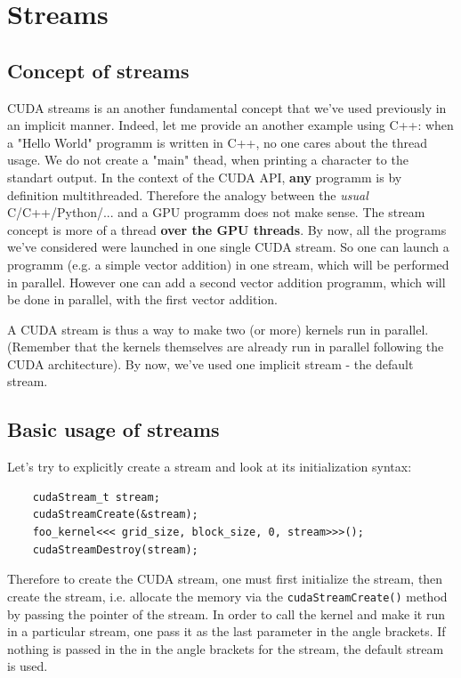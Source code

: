 \documentclass[12pt]{article}
\begin{document}
\section{Streams}
\subsection{Concept of streams}
CUDA streams is an another fundamental concept that we've used previously in an implicit manner.
Indeed, let me provide an another example using C++: when a "Hello World" programm is written in C++, 
no one cares about the thread usage. We do not create a "main" thead, when printing a character to 
the standart output. In the context of the CUDA API, \textbf{any} programm is by definition multithreaded. 
Therefore the analogy between the \textit{usual} C/C++/Python/... and a GPU programm does not make sense.
The stream concept is more of a thread \textbf{over the GPU threads}. 
By now, all the programs we've considered were launched in one single CUDA stream. So one can launch a 
programm (e.g. a simple vector addition) in one stream, which will be performed in parallel. However one can 
add a second vector addition programm, which will be done in parallel, with the first vector addition.



A CUDA stream is thus a way to make two (or more) kernels run in parallel. (Remember that the kernels 
themselves are already run in parallel following the CUDA architecture). By now, we've used one implicit stream - the default stream.

\subsection{Basic usage of streams}
Let's try to explicitly create a stream and look at its initialization syntax:

\begin{listing}[ht!]
\begin{verbatim}
    cudaStream_t stream;
    cudaStreamCreate(&stream);
    foo_kernel<<< grid_size, block_size, 0, stream>>>();
    cudaStreamDestroy(stream);
\end{verbatim}
\end{listing}

Therefore to create the CUDA stream, one must first initialize the stream, then create the stream, i.e. 
allocate the memory via the \verb|cudaStreamCreate()| method by passing the pointer of the stream. 
In order to call the kernel and make it run in a particular stream, one pass it as the last parameter in the angle brackets.
If nothing is passed in the in the angle brackets for the stream, the default stream is used.
\end{document}

